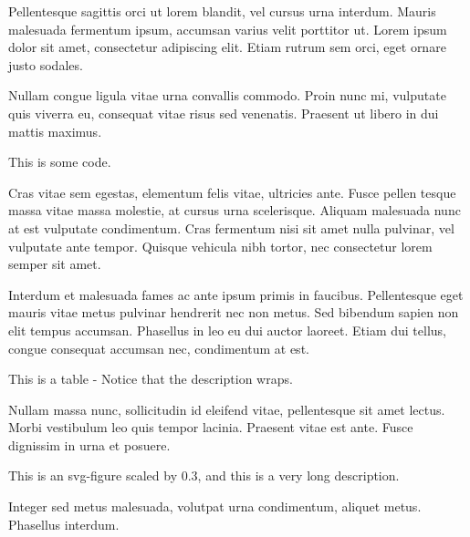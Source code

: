\documentclass{textbook}
\begin{document}
Pellentesque sagittis orci ut lorem blandit, vel cursus urna interdum. Mauris malesuada fermentum ipsum, accumsan varius velit porttitor ut. Lorem ipsum dolor sit amet, consectetur adipiscing elit. Etiam rutrum sem orci, eget ornare justo sodales.


Nullam congue ligula vitae urna convallis commodo. Proin nunc mi, vulputate quis viverra eu, consequat vitae risus sed venenatis. Praesent ut libero in dui mattis maximus.

    {This is some code.}

Cras vitae sem egestas, elementum felis vitae, ultricies ante. Fusce pellen tesque massa vitae massa molestie, at cursus urna scelerisque. Aliquam malesuada nunc at est vulputate condimentum. Cras fermentum nisi sit amet nulla pulvinar, vel vulputate ante tempor. Quisque vehicula nibh tortor, nec consectetur lorem semper sit amet.

Interdum et malesuada fames ac ante ipsum primis in faucibus. Pellentesque eget mauris vitae metus pulvinar hendrerit nec non metus. Sed bibendum sapien non elit tempus accumsan. Phasellus in leo eu dui auctor laoreet. Etiam dui tellus, congue consequat accumsan nec, condimentum at est.

    {This is a table - Notice that the description wraps.}

Nullam massa nunc, sollicitudin id eleifend vitae, pellentesque sit amet lectus. Morbi vestibulum leo quis tempor lacinia. Praesent vitae est ante. Fusce dignissim in urna et posuere.

    {This is an svg-figure scaled by 0.3, and this is a very long description.}

Integer sed metus malesuada, volutpat urna condimentum, aliquet metus. Phasellus interdum.
\end{document}
